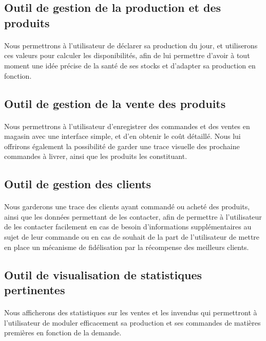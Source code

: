     \subsection{Outil de gestion de la production et des produits}
        \paragraph{}
            Nous permettrons à l'utilisateur de déclarer sa production du jour,
            et utiliserons ces valeurs pour calculer les disponibilités, afin de
            lui permettre d'avoir à tout moment une idée précise de la santé de
            ses stocks et d'adapter sa production en fonction.
    \subsection{Outil de gestion de la vente des produits}
        \paragraph{}
            Nous permettrons à l'utilisateur d'enregistrer des commandes et des
            ventes en magasin avec une interface simple, et d'en obtenir le
            coût détaillé.
            Nous lui offrirons également la possibilité de garder une trace
            visuelle des prochaine commandes à livrer, ainsi que les produits
            les constituant.
    \subsection{Outil de gestion des clients}
        \paragraph{}
            Nous garderons une trace des clients ayant commandé ou acheté des
            produits, ainsi que les données permettant de les contacter,
            afin de permettre à l'utilisateur de les contacter facilement en
            cas de besoin d'informations supplémentaires au sujet de leur
            commande ou en cas de souhait de la part de l'utilisateur de mettre
            en place un mécanisme de fidélisation par la récompense des
            meilleurs clients.
    \subsection{Outil de visualisation de statistiques pertinentes}
        \paragraph{}
            Nous afficherons des statistiques sur les ventes et les invendus qui
            permettront à l'utilisateur de moduler efficacement sa production et
            ses commandes de matières premières en fonction de la demande.
